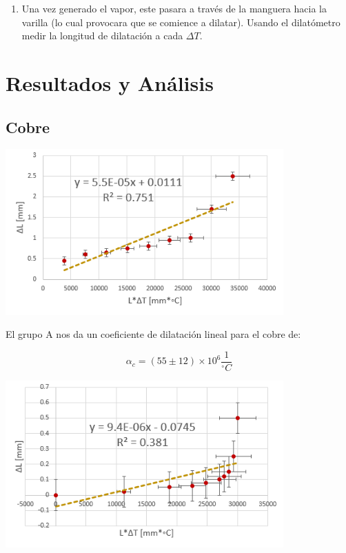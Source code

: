 \documentclass[DIV=calc, paper=a4, fontsize=11pt]{scrartcl}
\newenvironment{Figura}
  {\par\medskip\noindent\minipage{\linewidth}}
  {\endminipage\par\medskip}
\begin{document}
\begin{multicols}{2}
\begin{enumerate}
    \item Una vez generado el vapor, este pasara a través de la manguera hacia la varilla (lo cual provocara que se comience a dilatar). Usando el dilatómetro medir la longitud de dilatación a cada $\Delta T$.

\end{enumerate}
    


\section*{Resultados y Análisis}

\subsection*{Cobre}

\begin{Figura}
\centering
    \includegraphics[width=0.8\textwidth]{grafica/cobreA.PNG}
    \label{fig}
\end{Figura}

El grupo A nos da un coeficiente de dilatación lineal para el cobre de:

\begin{equation*}
    \alpha_{c} = (55 \pm 12)\times 10^{6} \frac{1}{^{\circ}C}
\end{equation*}


\begin{Figura}
\centering
    \includegraphics[width=0.8\textwidth]{grafica/cobreB.PNG}
    \label{fig}
\end{Figura}


\end{multicols}
\end{document}
